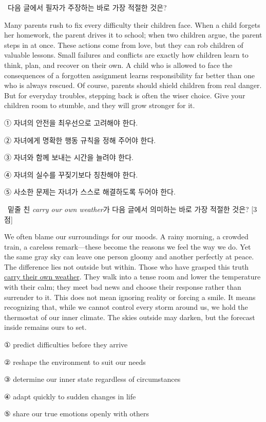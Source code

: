 \documentclass[10pt,a4paper,twocolumn]{article}
\newcommand{\probno}[1]{\noindent{\fontsize{12}{14}\selectfont\bfseries #1.}\ }
\newcommand{\instr}[1]{{\sffamily #1}\par\vspace{2pt}}
\begin{document}
\probno{20}\instr{다음 글에서 필자가 주장하는 바로 가장 적절한 것은?}
\par\noindent Many parents rush to fix every difficulty their children face. When a child forgets her homework, the parent drives it to school; when two children argue, the parent steps in at once. These actions come from love, but they can rob children of valuable lessons. Small failures and conflicts are exactly how children learn to think, plan, and recover on their own. A child who is allowed to face the consequences of a forgotten assignment learns responsibility far better than one who is always rescued. Of course, parents should shield children from real danger. But for everyday troubles, stepping back is often the wiser choice. Give your children room to stumble, and they will grow stronger for it.
\begin{choices}
\item ① 자녀의 안전을 최우선으로 고려해야 한다.
\item ② 자녀에게 명확한 행동 규칙을 정해 주어야 한다.
\item ③ 자녀와 함께 보내는 시간을 늘려야 한다.
\item ④ 자녀의 실수를 꾸짖기보다 칭찬해야 한다.
\item ⑤ 사소한 문제는 자녀가 스스로 해결하도록 두어야 한다.
\end{choices}
\vspace{6pt}

\probno{21}\instr{밑줄 친 \textit{carry our own weather}가 다음 글에서 의미하는 바로 가장 적절한 것은? [3점]}
\par\noindent We often blame our surroundings for our moods. A rainy morning, a crowded train, a careless remark—these become the reasons we feel the way we do. Yet the same gray sky can leave one person gloomy and another perfectly at peace. The difference lies not outside but within. Those who have grasped this truth \underline{carry their own weather}. They walk into a tense room and lower the temperature with their calm; they meet bad news and choose their response rather than surrender to it. This does not mean ignoring reality or forcing a smile. It means recognizing that, while we cannot control every storm around us, we hold the thermostat of our inner climate. The skies outside may darken, but the forecast inside remains ours to set.
\begin{choices}
\item ① predict difficulties before they arrive
\item ② reshape the environment to suit our needs
\item ③ determine our inner state regardless of circumstances
\item ④ adapt quickly to sudden changes in life
\item ⑤ share our true emotions openly with others
\end{choices}
\vspace{6pt}
\end{document}
